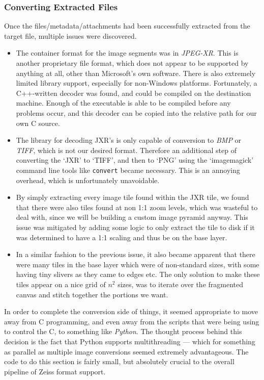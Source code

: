 \subsubsection{Converting Extracted Files}
Once the files/metadata/attachments had been successfully extracted from the target file, multiple issues were
discovered.
\begin{itemize}
	\item The container format for the image segments was in \emph{JPEG-XR}. This is another proprietary
		file format, which does not appear to be supported by anything at all, other than Microsoft's own software.
		There is also extremely limited library support, especially for non-Windows platforms.
		Fortunately, a C++-written  decoder was found, and could
		be compiled on the destination machine. Enough of the executable is able to be compiled before any problems
		occur, and this decoder can be copied into the relative path for our own C source.
	\item The library for decoding JXR's is only
		capable of conversion to \emph{BMP} or \emph{TIFF}, which is not our desired format. Therefore an additional step of
		converting the `JXR' to `TIFF', and then to `PNG' using the `imagemagick' command line tools like \verb|convert|
		became necessary.
		This is an annoying overhead, which is unfortunately unavoidable.
	\item By simply extracting every image tile found within the JXR tile, we found that
		there were also tiles found at non 1:1 zoom levels, which was wasteful to deal with, since we will be building
		a custom image pyramid anyway. This issue was mitigated by adding some logic to only extract the tile to disk if
		it was determined to have a 1:1 scaling and thus be on the base layer.
	\item In a similar fashion to the previous issue, it also became apparent that there were many tiles in the
		base layer which were of non-standard sizes, with some having tiny slivers as they came to edges etc.
		The only solution to make these tiles appear on a nice grid of $n^2$ sizes, was to iterate over the fragmented
		canvas and stitch together the portions we want.
\end{itemize}

In order to complete the conversion side of things, it seemed appropriate to move away from C programming, and
even away from the scripts that were being using to control the C, to something like \emph{Python}.
The thought process behind this decision is the fact that Python supports multithreading --- which for something
as parallel as multiple image conversions seemed extremely advantageous. The code to do this section is fairly
small, but absolutely crucial to the overall pipeline of Zeiss format support.

